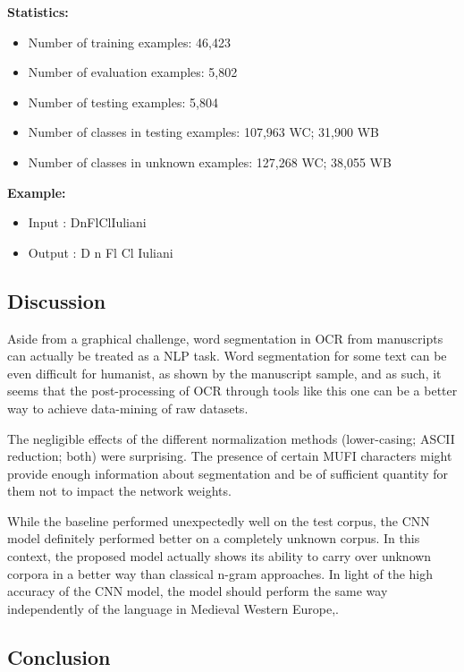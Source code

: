 \documentclass{jdmdh}
\begin{document}
\textbf{Statistics:}

\begin{itemize}
\item Number of training examples: 46,423
\item Number of evaluation examples: 5,802
\item Number of testing examples: 5,804
\item Number of classes in testing examples: 107,963 WC; 31,900 WB
\item Number of classes in unknown examples: 127,268 WC; 38,055 WB
\end{itemize}

\textbf{Example:}

\begin{itemize}
    \item Input : DnFlClIuliani
    \item Output : D n Fl Cl Iuliani
\end{itemize}

\subsection{Discussion}

Aside from a graphical challenge, word segmentation in OCR from manuscripts can actually be treated as a NLP task. Word segmentation for some text can be even difficult for humanist, as shown by the manuscript sample, and as such, it seems that the post-processing of OCR through tools like this one can be a better way to achieve data-mining of raw datasets.

The negligible effects of the different normalization methods (lower-casing; ASCII reduction; both) were surprising. The presence of certain MUFI characters might provide enough information about segmentation and be of sufficient quantity for them not to impact the network weights.

While the baseline performed unexpectedly well on the test corpus, the CNN model definitely performed better on a completely unknown corpus. In this context, the proposed model actually shows its ability to carry over unknown corpora in a better way than classical n-gram approaches. In light of the high accuracy of the CNN model, the model should perform the same way independently of the language in Medieval Western Europe,.

\subsection{Conclusion}
\end{document}
